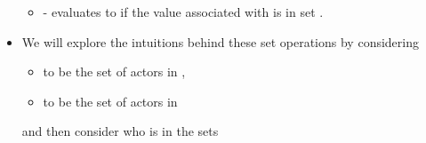 \documentclass[letterpaper,10pt,english]{sphinxmanual}
\begin{document}
\begin{itemize}
\begin{itemize}
%
\begin{sphinxVerbatim}[commandchars=\\\{\}]
  
\end{sphinxVerbatim}

\item {} 
 - evaluates to  if the value associated with
 is in set .

\end{itemize}

\item {} 
We will explore the intuitions behind these set operations by
considering
\begin{itemize}
\item {} 
 to be the set of actors in ,

\item {} 
 to be the set of actors in 

\end{itemize}

and then consider who is in the sets

%
\begin{sphinxVerbatim}[commandchars=\\\{\}]
  

  

  

  
\end{sphinxVerbatim}

\end{itemize}
\end{document}
